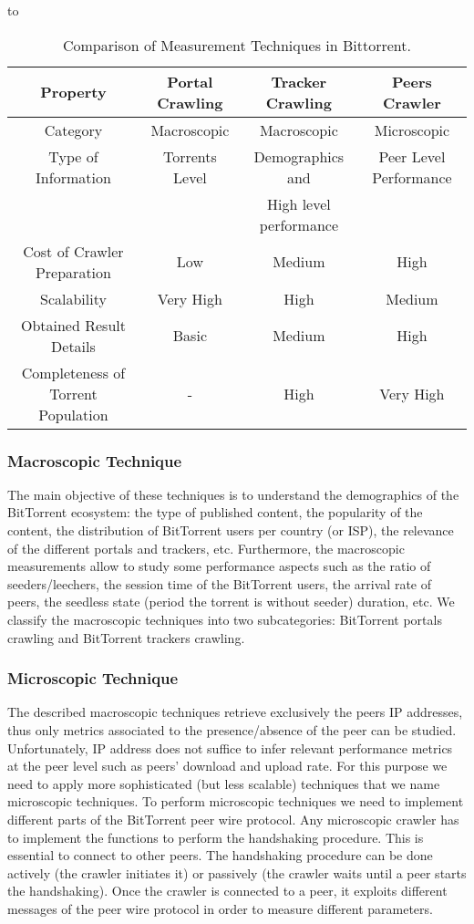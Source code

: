 \begin{table}[thb]
\caption{Comparison of Measurement Techniques in Bittorrent.}
\label{tab:measurementtechniques}
\hbox to\hsize{\hfil}
\begin{tabular}{c|c|c|c}\hline\hline
Property & Portal Crawling & Tracker Crawling & Peers Crawler \\ \hline
Category & Macroscopic & Macroscopic & Microscopic \\ \hline
Type of Information & Torrents Level & Demographics and  & Peer Level Performance \\ 
 &  & High level performance  & \\ \hline
Cost of Crawler Preparation & Low & Medium & High \\ \hline
Scalability & Very High & High & Medium \\ \hline
Obtained Result Details & Basic & Medium & High \\ \hline
Completeness of Torrent Population & - & High & Very High \\ \hline
\end{tabular}
\end{table}

\subsubsection{Macroscopic Technique}
The main objective of these techniques is to understand the demographics of the BitTorrent ecosystem: the type of published content, the popularity of the content, the distribution of BitTorrent users per country (or ISP), the relevance of the different portals and trackers, etc. 
Furthermore, the macroscopic measurements allow to study some performance aspects such as the ratio of seeders/leechers, the session time of the BitTorrent users, the arrival rate of peers, the seedless state (period the torrent is without seeder) duration, etc.
We classify the macroscopic techniques into two subcategories: BitTorrent portals crawling and BitTorrent trackers crawling.

\subsubsection{Microscopic Technique}
The described macroscopic techniques retrieve exclusively the peers IP addresses, thus only metrics associated to the presence/absence of the peer can be studied. Unfortunately, IP address does not suffice to infer relevant performance metrics at the peer level such as peers’ download and upload rate. 
For this purpose we need to apply more sophisticated (but less scalable) techniques that we name microscopic techniques.
To perform microscopic techniques we need to implement different parts of the BitTorrent peer wire protocol. 
Any microscopic crawler has to implement the functions to perform the handshaking procedure. 
This is essential to connect to other peers. 
The handshaking procedure can be done actively (the crawler initiates it) or passively (the crawler waits until a peer starts the handshaking). 
Once the crawler is connected to a peer, it exploits different messages of the peer wire protocol in order to measure different parameters. 


